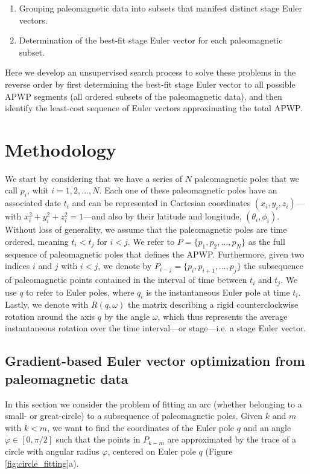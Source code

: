 \documentclass{article} %
\begin{document}
\begin{enumerate}
    \item Grouping paleomagnetic data into subsets that manifest distinct stage Euler vectors.
    \item Determination of the best-fit stage Euler vector for each paleomagnetic subset.
\end{enumerate}

Here we develop an unsupervised search process to solve these problems in the reverse order by first determining the best-fit stage Euler vector to all possible APWP segments (all ordered subsets of the paleomagnetic data), and then identify the least-cost sequence of Euler vectors approximating the total APWP. 

\section{Methodology}

We start by considering that we have a series of $N$ paleomagnetic poles that we call $p_i$, whit $i = 1, 2, \ldots, N$. Each one of these paleomagnetic poles have an associated date $t_i$ and can be represented in Cartesian coordinates $(x_i, y_i, z_i)$---with $x_i^2 + y_i^2 + z_i^2 = 1$---and also by their latitude and longitude, $(\theta_i, \phi_i)$. Without loss of generality, we assume that the paleomagnetic poles are time ordered, meaning $t_i < t_j$ for $i < j$. We refer to $P = \{ p_1, p_2, \ldots, p_N \}$ as the full sequence of paleomagnetic poles that defines the APWP. Furthermore, given two indices $i$ and $j$ with ${i < j}$, we denote by $P_{i-j} = \{ p_i, p_{i+1}, \ldots, p_{j}\}$ the subsequence of paleomagnetic points contained in the interval of time between $t_i$ and $t_j$. We use $q$ to refer to Euler poles, where $q_i$ is the instantaneous Euler pole at time $t_i$. Lastly, we denote with $R(q, \omega)$ the matrix describing a rigid counterclockwise rotation around the axis $q$ by the angle $\omega$, which thus represents the average instantaneous rotation over the time interval---or stage---i.e. a stage Euler vector.

\subsection{Gradient-based Euler vector optimization from paleomagnetic data}

In this section we consider the problem of fitting an arc (whether belonging to a small- or great-circle) to a subsequence of paleomagnetic poles. Given $k$ and $m$ with $k< m$, we want to find the coordinates of the Euler pole $q$ and an angle $\varphi \in [0, \pi / 2]$ such that the points in $P_{k-m}$ are approximated by the trace of a circle with angular radius $\varphi$, centered on Euler pole $q$ (Figure \ref{fig:circle_fitting}a).
\end{document}
